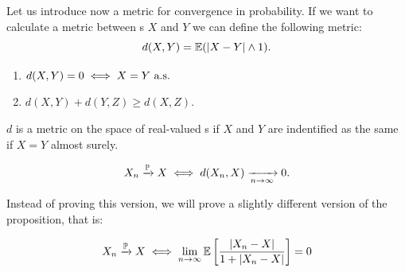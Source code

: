 \documentclass{report}
\begin{document}
Let us introduce now a metric for convergence in probability. If we want to calculate a metric between \rv s $X$ and $Y$ we can define the following metric:
\[d(X,Y)=\mathbb{E}(|X-Y|\wedge1).\]
\begin{remark}
	\begin{enumerate}[\circnum]
		\item $d(X,Y)=0 \iff X=Y\text{ a.s.}$
		\item $d(X,Y)+d(Y,Z)\geq d(X,Z).$
	\end{enumerate}
	$d$ is a metric on the space of real-valued \rv s if $X$ and $Y$ are indentified as the same \rv{} if $X=Y$ almost surely.
\end{remark}
\begin{proposition}
	\[ X_n\xrightarrow[]{\mathbb{P}} X\iff d(X_n,X)\xrightarrow[n\to\infty]{}0. \]
\end{proposition}
Instead of proving this version, we will prove a slightly different version of the proposition, that is:
\begin{theorem}
	$$X_n\xrightarrow[]{\mathbb{P}} X\iff\lim_{n\to\infty}\mathbb{E}\left[\frac{|X_n-X|}{1+|X_n-X|}\right]=0$$
\end{theorem}
\end{document}
